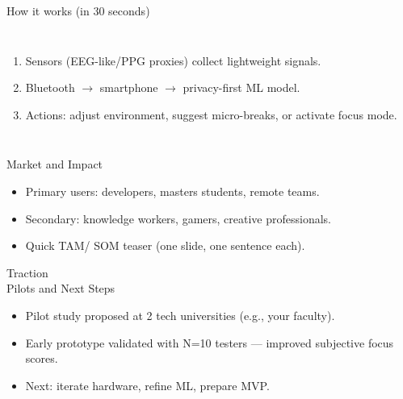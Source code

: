 \documentclass[10pt]{beamer}
\begin{document}
\begin{frame}{How it works (in 30 seconds)}
    \begin{columns}
        \begin{enumerate}
            \item Sensors (EEG-like/PPG proxies) collect lightweight signals.
            \item Bluetooth \(\rightarrow\) smartphone \(\rightarrow\) privacy-first ML model.
            \item Actions: adjust environment, suggest micro-breaks, or activate focus mode.
        \end{enumerate}
    \end{columns}
\end{frame}

\begin{frame}{Market and Impact}
    \begin{itemize}
        \item Primary users: developers, masters students, remote teams.
        \item Secondary: knowledge workers, gamers, creative professionals.
        \item Quick TAM/ SOM teaser (one slide, one sentence each).
    \end{itemize}
\end{frame}

\begin{frame}{Traction \\ Pilots and Next Steps}
    \begin{itemize}
        \item Pilot study proposed at 2 tech universities (e.g., your faculty).
        \item Early prototype validated with N=10 testers — improved subjective focus scores.
        \item Next: iterate hardware, refine ML, prepare MVP.
    \end{itemize}
\end{frame}
\end{document}
